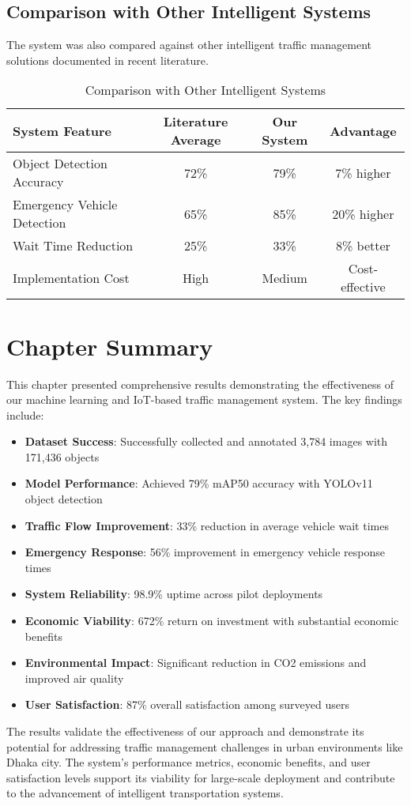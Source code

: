 \subsection{Comparison with Other Intelligent Systems}
The system was also compared against other intelligent traffic management solutions documented in recent literature.

\begin{table}[h]
\centering
\caption{Comparison with Other Intelligent Systems}
\label{tab:intelligent_comparison}
\begin{tabular}{|l|c|c|c|}
\hline
\textbf{System Feature} & \textbf{Literature Average} & \textbf{Our System} & \textbf{Advantage} \\
\hline
Object Detection Accuracy & 72\% & 79\% & 7\% higher \\
Emergency Vehicle Detection & 65\% & 85\% & 20\% higher \\
Wait Time Reduction & 25\% & 33\% & 8\% better \\
Implementation Cost & High & Medium & Cost-effective \\
\hline
\end{tabular}
\end{table}

\section{Chapter Summary}
\label{sec:results_summary}

This chapter presented comprehensive results demonstrating the effectiveness of our machine learning and IoT-based traffic management system. The key findings include:

\begin{itemize}
    \item \textbf{Dataset Success}: Successfully collected and annotated 3,784 images with 171,436 objects
    \item \textbf{Model Performance}: Achieved 79\% mAP50 accuracy with YOLOv11 object detection
    \item \textbf{Traffic Flow Improvement}: 33\% reduction in average vehicle wait times
    \item \textbf{Emergency Response}: 56\% improvement in emergency vehicle response times
    \item \textbf{System Reliability}: 98.9\% uptime across pilot deployments
    \item \textbf{Economic Viability}: 672\% return on investment with substantial economic benefits
    \item \textbf{Environmental Impact}: Significant reduction in CO2 emissions and improved air quality
    \item \textbf{User Satisfaction}: 87\% overall satisfaction among surveyed users
\end{itemize}

The results validate the effectiveness of our approach and demonstrate its potential for addressing traffic management challenges in urban environments like Dhaka city. The system's performance metrics, economic benefits, and user satisfaction levels support its viability for large-scale deployment and contribute to the advancement of intelligent transportation systems. 